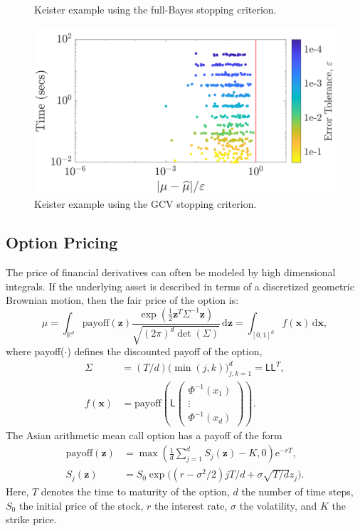\documentclass[graybox,footinfo]{svmult}
\newcommand{\bm}[1]{\boldsymbol{#1}}
\newcommand{\mSigma}{\mathsf{\Sigma}}
\newcommand{\dif}[1]{\text{d}{#1}}
\newcommand{\reals}{\mathbb{R}}
\newcommand{\vx}{\bm{x}}
\newcommand{\dvx}{\dif{\bm{x}}}
\newcommand{\vz}{\bm{z}}
\newcommand{\dvz}{\dif{\bm{z}}}
\newcommand{\mL}{\mathsf{L}}
\newcommand{\me}{\mathrm{e}}
\begin{document}
{{{{{{\begin{figure}
\caption[Sobol: Keister guaranteed: Full Bayes]{Keister example using the full-Bayes stopping criterion.}
\label{fig:Sobol-keister-guaranteed-FB}
\end{figure}
\begin{figure}
\centering
\includegraphics[width=0.95\linewidth]{"figures/Sobol/Sobol_Keister_guaranteed_time_GCV__d4_r1_2019-Sep-1"}
\caption[Sobol: Keister guaranteed: GCV]{Keister example using the GCV stopping criterion.}
\label{fig:Sobol-keister-guaranteed-GCV}
\end{figure}







\subsection{Option Pricing}

The price of financial derivatives can often be modeled by high dimensional integrals. If the underlying asset is described in terms of a discretized geometric Brownian motion, then the fair price of the option is:
\begin{equation*}
\mu = \int_{\reals^d} \text{payoff}(\vz) \frac{\exp(\frac 12 \vz^T\mSigma^{-1}\vz)}{\sqrt{(2\pi)^d \det(\mSigma)}} \, \dvz = \int_{[0,1]^d} f(\vx) \, \dvx,
\end{equation*} 
where {payoff($\cdot$)} defines the discounted payoff of the option,
\begin{align*}
\mSigma &= (T/d) \bigl(\min(j,k) \bigr)_{j,k=1}^d = \mL \mL^T,\\
f(\vx) &= \text{payoff} \left(\mL 
\begin{pmatrix}
\Phi^{-1}(x_1) \\ \vdots \\ \Phi^{-1}(x_d)
\end{pmatrix} \right).
\end{align*}
The Asian arithmetic mean call option has a payoff of the form
\begin{align*}
\text{payoff}(\vz) &= \max\left( \frac 1d  \sum_{j=1}^d S_j(\vz) - K, 0 \right) \me^{-r T}, \\
S_j(\vz) &= S_0 \exp\bigl((r-\sigma^2/2)jT/d + \sigma \sqrt{T/d} z_j \bigr).
\end{align*}
Here, $T$ denotes the time to maturity of the option, $d$ the number of time steps, $S_0$ the initial price of the stock, $r$ the interest rate, $\sigma$ the volatility, and $K$ the strike price.  

}}}}}}
\end{document}

